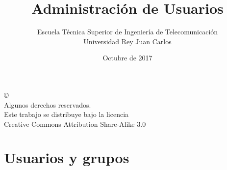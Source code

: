 \documentclass[ucs]{beamer}
\begin{document}
\title[Administración de Usuarios]{Administración de Usuarios }
\author[GSyC]{Escuela Técnica Superior de Ingeniería de Telecomunicación\\
Universidad Rey Juan Carlos}
\date[2017]{Octubre de 2017}




\begin{frame}
  \titlepage
\end{frame}



\begin{frame}[b]
\begin{flushright}
{\tiny
\copyright \insertshortdate~\insertshortauthor \\
  Algunos derechos reservados. \\
  Este trabajo se distribuye bajo la licencia \\
  Creative Commons Attribution Share-Alike 3.0\\
}
\end{flushright}  
\end{frame}







  \section{Usuarios y grupos}
\end{document}
